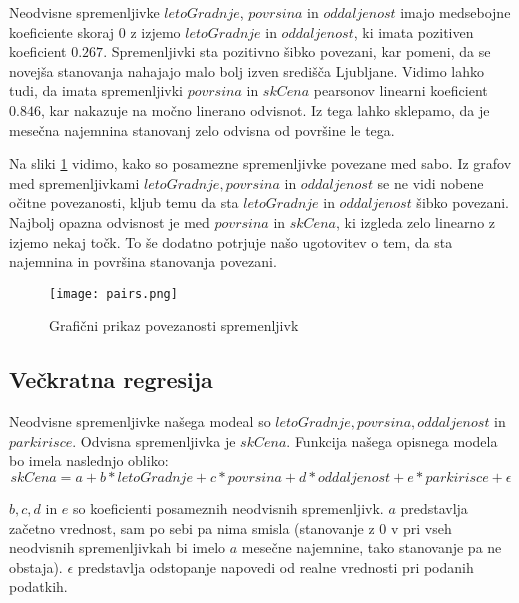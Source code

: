 \documentclass[a4paper, 12pt]{article}
\begin{document}
Neodvisne spremenljivke $ letoGradnje $, $ povrsina $ in
$ oddaljenost $ imajo medsebojne koeficiente skoraj $ 0 $ z izjemo
$ letoGradnje $ in $ oddaljenost $, ki imata pozitiven koeficient
$ 0.267 $. Spremenljivki sta pozitivno šibko povezani, kar pomeni, da se
novejša stanovanja nahajajo malo bolj izven središča Ljubljane. Vidimo lahko
tudi, da imata spremenljivki $ povrsina $ in $ skCena $ pearsonov linearni
koeficient $ 0.846 $, kar nakazuje na močno linerano odvisnot. Iz tega lahko
sklepamo, da je mesečna najemnina stanovanj zelo odvisna od površine le tega.

Na sliki \ref{figure:2} vidimo, kako so posamezne spremenljivke povezane med
sabo. Iz grafov med spremenljivkami $ letoGradnje, povrsina $ in $ oddaljenost $
se ne vidi nobene očitne povezanosti, kljub temu da sta $ letoGradnje $ in
$ oddaljenost $ šibko povezani. Najbolj opazna odvisnost je med $ povrsina $ in
$ skCena $, ki izgleda zelo linearno z izjemo nekaj točk. To še dodatno
potrjuje našo ugotovitev o tem, da sta najemnina in površina stanovanja
povezani.

\begin{figure}[H]
	\centering
	\texttt{[image: pairs.png]}
	\caption{Grafični prikaz povezanosti spremenljivk}
	\label{figure:2}
\end{figure}

\subsection{Večkratna regresija}

Neodvisne spremenljivke našega modeal so $ letoGradnje, povrsina, oddaljenost $
in $ parkirisce $. Odvisna spremenljivka je $ skCena $. Funkcija našega
opisnega modela bo imela naslednjo obliko:
\begin{equation}
	skCena = a+b*letoGradnje+c*povrsina+d*oddaljenost+e*parkirisce+\epsilon
\end{equation}

$ b, c, d $ in $ e $ so koeficienti posameznih neodvisnih spremenljivk. $ a $
predstavlja začetno vrednost, sam po sebi pa nima smisla (stanovanje z $ 0 $ v
pri vseh neodvisnih spremenljivkah bi imelo $ a $ mesečne najemnine, tako
stanovanje pa ne obstaja). $ \epsilon $ predstavlja odstopanje napovedi od
realne vrednosti pri podanih podatkih.
\end{document}
